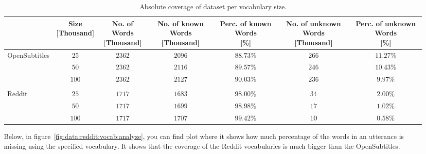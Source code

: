 \begin{table}[H]
	\begin{adjustbox}{max width=\textwidth}
		\centering
		\small
		\begin{tabular}{lcccccc}
			\toprule
			&\specialcell{Size\\ {[Thousand]}}
			&\specialcell{No. of Words\\ {[Thousand]}}
			&\specialcell{No. of known Words\\ {[Thousand]}}
			&\specialcell{Perc. of known Words \\ {[\%]}}
			&\specialcell{No. of unknown Words \\ {[Thousand]}}
			&\specialcell{Perc. of unknown Words \\ {[\%]}}\\
			\midrule
			OpenSubtitles	&$25$		&$2362$	&$2096$	&$88.73\%$ &$266$	&$11.27\%$\\
							&$50$		&$2362$	&$2116$	&$89.57\%$	&$246$	&$10.43\%$\\
							&$100$	&$2362$	&$2127$	&$90.03\%$	&$236$	&$9.97\%$\\\\
			Reddit		&$25$		&$1717$	&$1683$	&$98.00\%$	&$34$		&$2.00\%$\\
						&$50$		&$1717$	&$1699$	&$98.98\%$	&$17$		&$1.02\%$\\
						&$100$	&$1717$	&$1707$	&$99.42\%$	&$10$		&$0.58\%$\\
			\bottomrule
		\end{tabular}
	\end{adjustbox}
	\caption{Absolute coverage of dataset per vocabulary size.}
	\label{tbl:data:split:corpus:analyze}
\end{table}

Below, in figure~\ref{fig:data:reddit:vocab:analyze}, you can find plot where it shows how much percentage of the words in an utterance is missing using the specified vocabulary. It shows that the coverage of the Reddit vocabularies is much bigger than the OpenSubtitles.

